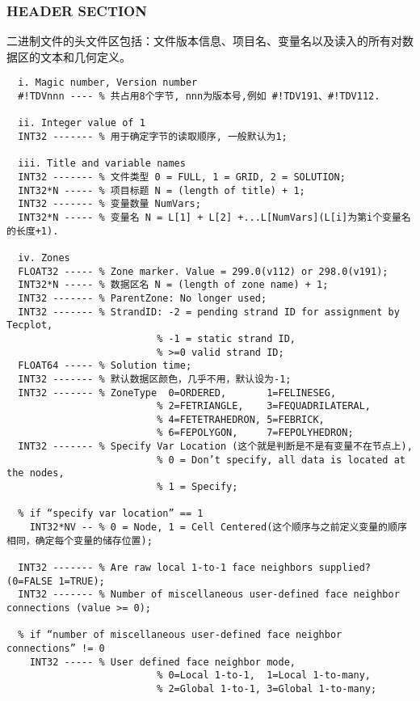 \documentclass[lang=cn,11pt,a4paper]{elegantpaper}
\begin{document}
\subsubsection{HEADER SECTION}\label{headersection}
二进制文件的头文件区包括：文件版本信息、项目名、变量名以及读入的所有对数据区的文本和几何定义。

\begin{lstlisting}
  i. Magic number, Version number
  #!TDVnnn ---- % 共占用8个字节, nnn为版本号,例如 #!TDV191、#!TDV112.

  ii. Integer value of 1
  INT32 ------- % 用于确定字节的读取顺序, 一般默认为1;

  iii. Title and variable names
  INT32 ------- % 文件类型 0 = FULL, 1 = GRID, 2 = SOLUTION;
  INT32*N ----- % 项目标题 N = (length of title) + 1;
  INT32 ------- % 变量数量 NumVars;
  INT32*N ----- % 变量名 N = L[1] + L[2] +...L[NumVars](L[i]为第i个变量名的长度+1).

  iv. Zones
  FLOAT32 ----- % Zone marker. Value = 299.0(v112) or 298.0(v191);
  INT32*N ----- % 数据区名 N = (length of zone name) + 1;
  INT32 ------- % ParentZone: No longer used;
  INT32 ------- % StrandID: -2 = pending strand ID for assignment by Tecplot,
                          % -1 = static strand ID,
                          % >=0 valid strand ID;
  FLOAT64 ----- % Solution time;
  INT32 ------- % 默认数据区颜色，几乎不用，默认设为-1;
  INT32 ------- % ZoneType  0=ORDERED,       1=FELINESEG,
                          % 2=FETRIANGLE,    3=FEQUADRILATERAL,
                          % 4=FETETRAHEDRON, 5=FEBRICK,
                          % 6=FEPOLYGON,     7=FEPOLYHEDRON;
  INT32 ------- % Specify Var Location (这个就是判断是不是有变量不在节点上),
                          % 0 = Don’t specify, all data is located at the nodes,
                          % 1 = Specify;

  % if “specify var location” == 1
    INT32*NV -- % 0 = Node, 1 = Cell Centered(这个顺序与之前定义变量的顺序相同，确定每个变量的储存位置);

  INT32 ------- % Are raw local 1-to-1 face neighbors supplied?(0=FALSE 1=TRUE);
  INT32 ------- % Number of miscellaneous user-defined face neighbor connections (value >= 0);
  
  % if “number of miscellaneous user-defined face neighbor connections” != 0
    INT32 ----- % User defined face neighbor mode,
                          % 0=Local 1-to-1,  1=Local 1-to-many,
                          % 2=Global 1-to-1, 3=Global 1-to-many;


\end{lstlisting}
\end{document}
